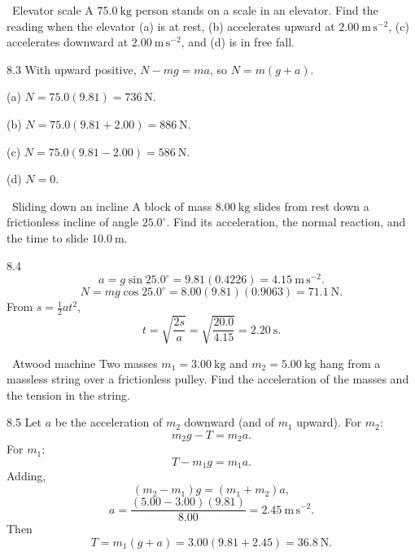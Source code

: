 \begin{exercise}{\warm\ Elevator scale}
A $75.0\ \mathrm{kg}$ person stands on a scale in an elevator. Find the reading
when the elevator (a) is at rest, (b) accelerates upward at
$2.00\ \mathrm{m\,s^{-2}}$, (c) accelerates downward at $2.00\ \mathrm{m\,s^{-2}}$,
and (d) is in free fall.
\end{exercise}

\begin{tabletworkspace}[6.5cm]
\end{tabletworkspace}

\begin{solution}{8.3}
With upward positive, $N-mg=ma$, so $N=m(g+a)$.

(a) $N=75.0(9.81)=736\ \mathrm{N}$.

(b) $N=75.0(9.81+2.00)=886\ \mathrm{N}$.

(c) $N=75.0(9.81-2.00)=586\ \mathrm{N}$.

(d) $N=0$.
\end{solution}

\begin{exercise}{\core\ Sliding down an incline}
A block of mass $8.00\ \mathrm{kg}$ slides from rest down a frictionless incline
of angle $25.0^\circ$. Find its acceleration, the normal reaction, and the time
to slide $10.0\ \mathrm{m}$.
\end{exercise}

\begin{tabletworkspace}[6.5cm]
\end{tabletworkspace}

\begin{solution}{8.4}
\[
a=g\sin25.0^\circ=9.81(0.4226)=4.15\ \mathrm{m\,s^{-2}}.
\]
\[
N=mg\cos25.0^\circ=8.00(9.81)(0.9063)=71.1\ \mathrm{N}.
\]
From $s=\frac12at^2$,
\[
t=\sqrt{\frac{2s}{a}}=\sqrt{\frac{20.0}{4.15}}=2.20\ \mathrm{s}.
\]
\end{solution}

\begin{exercise}{\core\ Atwood machine}
Two masses $m_1=3.00\ \mathrm{kg}$ and $m_2=5.00\ \mathrm{kg}$ hang from a
massless string over a frictionless pulley. Find the acceleration of the masses
and the tension in the string.
\end{exercise}

\begin{tabletworkspace}[6.5cm]
\end{tabletworkspace}

\begin{solution}{8.5}
Let $a$ be the acceleration of $m_2$ downward (and of $m_1$ upward). For $m_2$:
\[
m_2g-T=m_2a.
\]
For $m_1$:
\[
T-m_1g=m_1a.
\]
Adding,
\[
(m_2-m_1)g=(m_1+m_2)a,
\]
\[
a=\frac{(5.00-3.00)(9.81)}{8.00}=2.45\ \mathrm{m\,s^{-2}}.
\]
Then
\[
T=m_1(g+a)=3.00(9.81+2.45)=36.8\ \mathrm{N}.
\]
\end{solution}

